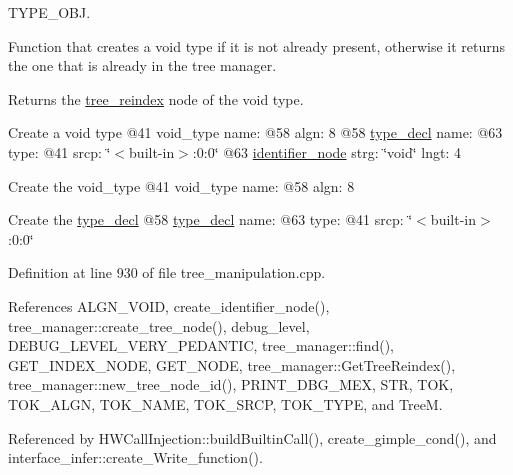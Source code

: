 T\+Y\+P\+E\+\_\+\+O\+BJ. 

Function that creates a void type if it is not already present, otherwise it returns the one that is already in the tree manager. \begin{DoxyReturn}{Returns}
the \hyperlink{classtree__reindex}{tree\+\_\+reindex} node of the void type.
\end{DoxyReturn}
Create a void type @41 void\+\_\+type name\+: @58 algn\+: 8 @58 \hyperlink{structtype__decl}{type\+\_\+decl} name\+: @63 type\+: @41 srcp\+: \char`\"{}$<$built-\/in$>$\+:0\+:0\char`\"{} @63 \hyperlink{structidentifier__node}{identifier\+\_\+node} strg\+: \char`\"{}void\char`\"{} lngt\+: 4

Create the void\+\_\+type @41 void\+\_\+type name\+: @58 algn\+: 8

Create the \hyperlink{structtype__decl}{type\+\_\+decl} @58 \hyperlink{structtype__decl}{type\+\_\+decl} name\+: @63 type\+: @41 srcp\+: \char`\"{}$<$built-\/in$>$\+:0\+:0\char`\"{} 

Definition at line 930 of file tree\+\_\+manipulation.\+cpp.



References A\+L\+G\+N\+\_\+\+V\+O\+ID, create\+\_\+identifier\+\_\+node(), tree\+\_\+manager\+::create\+\_\+tree\+\_\+node(), debug\+\_\+level, D\+E\+B\+U\+G\+\_\+\+L\+E\+V\+E\+L\+\_\+\+V\+E\+R\+Y\+\_\+\+P\+E\+D\+A\+N\+T\+IC, tree\+\_\+manager\+::find(), G\+E\+T\+\_\+\+I\+N\+D\+E\+X\+\_\+\+N\+O\+DE, G\+E\+T\+\_\+\+N\+O\+DE, tree\+\_\+manager\+::\+Get\+Tree\+Reindex(), tree\+\_\+manager\+::new\+\_\+tree\+\_\+node\+\_\+id(), P\+R\+I\+N\+T\+\_\+\+D\+B\+G\+\_\+\+M\+EX, S\+TR, T\+OK, T\+O\+K\+\_\+\+A\+L\+GN, T\+O\+K\+\_\+\+N\+A\+ME, T\+O\+K\+\_\+\+S\+R\+CP, T\+O\+K\+\_\+\+T\+Y\+PE, and TreeM.



Referenced by H\+W\+Call\+Injection\+::build\+Builtin\+Call(), create\+\_\+gimple\+\_\+cond(), and interface\+\_\+infer\+::create\+\_\+\+Write\+\_\+function().

